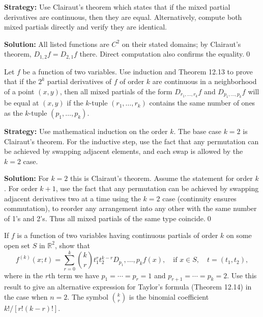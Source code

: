 \noindent\textbf{Strategy:} Use Clairaut's theorem which states that if the mixed partial derivatives are continuous, then they are equal. Alternatively, compute both mixed partials directly and verify they are identical.

\bigskip\noindent\textbf{Solution:}
All listed functions are $C^2$ on their stated domains; by Clairaut's theorem, $D_{1,2}f=D_{2,1}f$ there. Direct computation also confirms the equality.\qed


\begin{problembox}
\begin{problemstatement}
Let \( f \) be a function of two variables. Use induction and Theorem 12.13 to prove that if the \( 2^k \) partial derivatives of \( f \) of order \( k \) are continuous in a neighborhood of a point \( (x, y) \), then all mixed partials of the form \( D_{r_1, \ldots, r_k} f \) and \( D_{p_1, \ldots, p_k} f \) will be equal at \( (x, y) \) if the \( k \)-tuple \( (r_1, \ldots, r_k) \) contains the same number of ones as the \( k \)-tuple \( (p_1, \ldots, p_k) \).
\end{problemstatement}
\end{problembox}

\noindent\textbf{Strategy:} Use mathematical induction on the order \( k \). The base case \( k = 2 \) is Clairaut's theorem. For the inductive step, use the fact that any permutation can be achieved by swapping adjacent elements, and each swap is allowed by the \( k = 2 \) case.

\bigskip\noindent\textbf{Solution:}
For $k=2$ this is Clairaut's theorem. Assume the statement for order $k$. For order $k+1$, use the fact that any permutation can be achieved by swapping adjacent derivatives two at a time using the $k=2$ case (continuity ensures commutation), to reorder any arrangement into any other with the same number of 1's and 2's. Thus all mixed partials of the same type coincide.\qed


\begin{problembox}
\begin{problemstatement}
If \( f \) is a function of two variables having continuous partials of order \( k \) on some open set \( S \) in \( \mathbb{R}^2 \), show that
\[f^{(k)} (x; t) = \sum_{r=0}^{k} \binom{k}{r} t_1^r t_2^{k-r} D_{p_1}, \ldots, p_k f(x), \quad \text{if } x \in S, \quad t = (t_1, t_2),\]
where in the \( r \)th term we have \( p_1 = \cdots = p_r = 1 \) and \( p_{r+1} = \cdots = p_k = 2 \). Use this result to give an alternative expression for Taylor's formula (Theorem 12.14) in the case when \( n = 2 \). The symbol \( \binom{k}{r} \) is the binomial coefficient \( k! / [r! (k - r)!] \).
\end{problemstatement}
\end{problembox}


